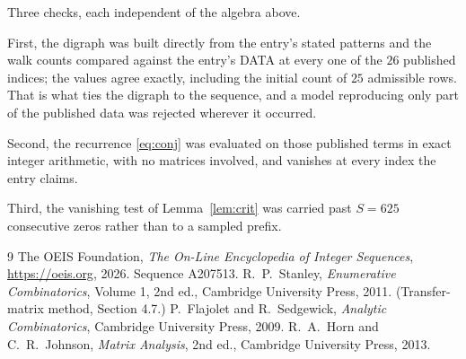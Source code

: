 \documentclass[11pt,a4paper]{article}
\theoremstyle{plain}
\theoremstyle{definition}
\begin{document}
Three checks, each independent of the algebra above.

First, the digraph was built directly from the entry's stated patterns and the walk counts
compared against the entry's DATA at every one of the $26$ published indices; the
values agree exactly, including the initial count of $25$ admissible rows. That is
what ties the digraph to the sequence, and a model reproducing only part of the published
data was rejected wherever it occurred.

Second, the recurrence \eqref{eq:conj} was evaluated on those published terms in exact
integer arithmetic, with no matrices involved, and vanishes at every index the entry claims.

Third, the vanishing test of Lemma~\ref{lem:crit} was carried past $S=625$ consecutive
zeros rather than to a sampled prefix.

\begin{thebibliography}{9}
 The OEIS Foundation, \emph{The On-Line Encyclopedia of Integer
Sequences}, \url{https://oeis.org}, 2026. Sequence A207513.
 R.~P.~Stanley, \emph{Enumerative Combinatorics}, Volume 1, 2nd ed.,
Cambridge University Press, 2011. (Transfer-matrix method, Section 4.7.)
 P.~Flajolet and R.~Sedgewick, \emph{Analytic Combinatorics}, Cambridge
University Press, 2009.
 R.~A.~Horn and C.~R.~Johnson, \emph{Matrix Analysis}, 2nd ed., Cambridge
University Press, 2013.
\end{thebibliography}
\end{document}
